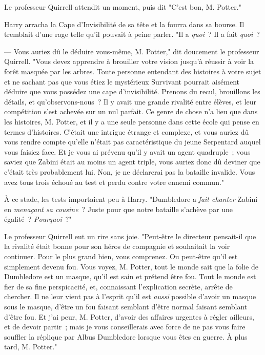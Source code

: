 \later

Le professeur Quirrell attendit un moment, puis dit "C'est bon, M. Potter."

Harry arracha la Cape d'Invisibilité de sa tête et la fourra dans sa bourse. Il tremblait d'une rage telle qu'il pouvait à peine parler. "Il a \emph{quoi}~? Il a fait \emph{quoi}~?

--- Vous auriez dû le déduire vous-même, M. Potter," dit doucement le professeur Quirrell. "Vous devez apprendre à brouiller votre vision jusqu'à réussir à voir la forêt masquée par les arbres. Toute personne entendant des histoires à votre sujet et ne sachant pas que vous étiez le mystérieux Survivant pourrait aisément déduire que vous possédez une cape d'invisibilité. Prenons du recul, brouillons les détails, et qu'observons-nous~? Il y avait une grande rivalité entre élèves, et leur compétition s'est achevée sur un nul parfait. Ce genre de chose n'a lieu que dans les histoires, M. Potter, et il y a une seule personne dans cette école qui pense en termes d'histoires. C'était une intrigue étrange et complexe, et vous auriez dû vous rendre compte qu'elle n'était pas caractéristique du jeune Serpentard auquel vous faisiez face. Et je vous ai prévenu qu'il y avait un agent quadruple~; vous saviez que Zabini était au moins un agent triple, vous auriez donc dû deviner que c'était très probablement lui. Non, je ne déclarerai pas la bataille invalide. Vous avez tous trois échoué au test et perdu contre votre ennemi commun."

À ce stade, les tests importaient peu à Harry. "Dumbledore a \emph{fait chanter} Zabini en \emph{menaçant sa cousine}~? Juste pour que notre bataille s'achève par une égalité~? \emph{Pourquoi}~?"

Le professeur Quirrell eut un rire sans joie. "Peut-être le directeur pensait-il que la rivalité était bonne pour son héros de compagnie et souhaitait la voir continuer. Pour le plus grand bien, vous comprenez. Ou peut-être qu'il est simplement devenu fou. Vous voyez, M. Potter, tout le monde sait que la folie de Dumbledore est un masque, qu'il est sain et prétend être fou. Tout le monde est fier de sa fine perspicacité, et, connaissant l'explication secrète, arrête de chercher. Il ne leur vient pas à l'esprit qu'il est \emph{aussi} possible d'avoir un masque sous le masque, d'être un fou faisant semblant d'être normal faisant semblant d'être fou. Et j'ai peur, M. Potter, d'avoir des affaires urgentes à régler ailleurs, et de devoir partir~; mais je vous conseillerais avec force de ne pas vous faire souffler la réplique par Albus Dumbledore lorsque vous êtes en guerre. À plus tard, M. Potter."

